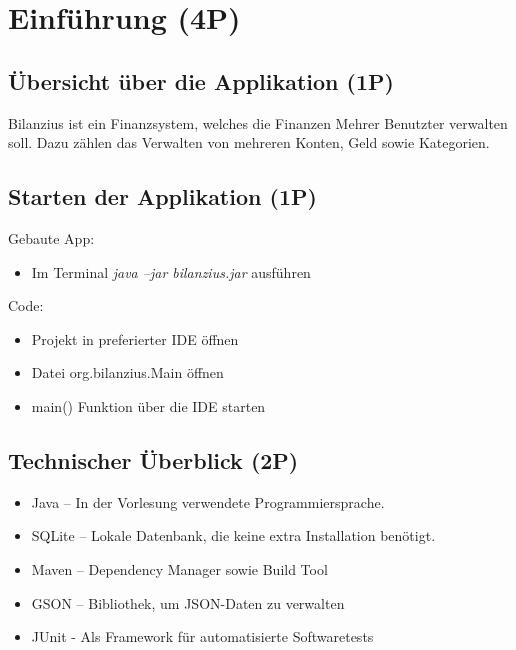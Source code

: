 \section{Einführung (4P)}

\subsection{Übersicht über die Applikation (1P)}
Bilanzius ist ein Finanzsystem, welches die Finanzen Mehrer Benutzter verwalten soll. Dazu zählen das Verwalten von mehreren Konten, Geld sowie Kategorien. 

\subsection{Starten der Applikation (1P)}
Gebaute App:  
\begin{itemize}
    \item Im Terminal \textit{java –jar bilanzius.jar} ausführen
\end{itemize}
Code: 
\begin{itemize}
    \item Projekt in preferierter IDE öffnen
    \item Datei org.bilanzius.Main öffnen
    \item main() Funktion über die IDE starten
\end{itemize}

\subsection{Technischer Überblick (2P)}
\begin{itemize}
    \item Java – In der Vorlesung verwendete Programmiersprache.
    \item SQLite – Lokale Datenbank, die keine extra Installation benötigt.
    \item Maven – Dependency Manager sowie Build Tool
    \item GSON – Bibliothek, um JSON-Daten zu verwalten
    \item JUnit - Als Framework für automatisierte Softwaretests
\end{itemize}